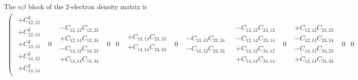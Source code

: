 \documentclass[pra,nofootinbib]{revtex4-1}
\newcommand{\C}[2]{C_{{#1},{#2}}}
\begin{document}
The $\alpha\beta$ block of the 2-electron density matrix is
\noindent
\tiny
\begin{eqnarray}
   \left(\begin{array}{cccccccccccccccc}
     \begin{array}{c}
     + \C{12}{12}^2 \\
     + \C{12}{14}^2 \\
     + \C{13}{13}^2 \\
     + \C{14}{12}^2 \\
     + \C{14}{14}^2
     \end{array} &
     0 &
     \begin{array}{c}
     - \C{12}{12}\C{12}{23} \\
     + \C{12}{14}\C{12}{34} \\
     - \C{14}{12}\C{14}{23} \\
     + \C{14}{14}\C{14}{34}
     \end{array} &
     0 &
     0 &
     \begin{array}{c}
     + \C{13}{13}\C{23}{23} \\
     + \C{14}{14}\C{24}{24} \\
     \end{array} &
     0 &
     \begin{array}{c}
     - \C{13}{13}\C{23}{34} \\
     - \C{14}{12}\C{24}{24}
     \end{array} &
     \begin{array}{c}
     - \C{12}{12}\C{23}{12} \\
     - \C{12}{14}\C{23}{14} \\
     + \C{14}{12}\C{34}{12} \\
     + \C{14}{14}\C{34}{14}
     \end{array} &
     0 &
     \begin{array}{c}
     + \C{12}{12}\C{23}{23} \\
     - \C{12}{14}\C{23}{34} \\
     - \C{14}{12}\C{34}{23} \\
     + \C{14}{14}\C{34}{34}
     \end{array} &
     0 &
     0 &
     \begin{array}{c}
     - \C{12}{14}\C{24}{24} \\
     - \C{13}{13}\C{34}{23} \\
     \end{array} &

\end{array}
\end{eqnarray}
\end{document}
